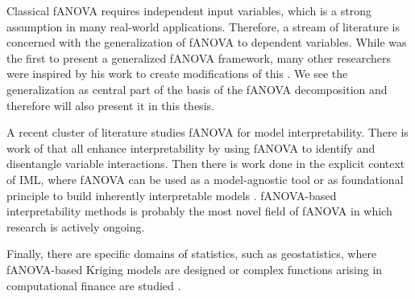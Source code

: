 Classical fANOVA requires independent input variables, which is a strong assumption in many real‑world applications. Therefore, a stream of literature is concerned with the generalization of fANOVA to dependent variables.
While \cite{hooker2007} was the first to present a generalized fANOVA framework, many other researchers were inspired by his work to create modifications of this \citep{rahman2014,chastaing2012,ilidrissi2025}.
We see the generalization as central part of the basis of the fANOVA decomposition and therefore will also present it in this thesis.\par

A recent cluster of literature studies fANOVA for model interpretability. There is work of \cite{lengerich2020, konig2024, choi2025} that all enhance interpretability by using fANOVA to identify and disentangle variable interactions.
Then there is work done in the explicit context of IML, where fANOVA can be used as a model-agnostic tool \citep{hooker2004,fumagalli2025} or as foundational principle to build inherently interpretable models \citep{hu2025}. fANOVA-based interpretability methods is probably the most novel field of fANOVA in which research is actively ongoing.\par

Finally, there are specific domains of statistics, such as geostatistics, where fANOVA-based Kriging models are designed \citep{muehlenstaedt2012} or
complex functions arising in computational finance are studied \citep{liu2006}.







